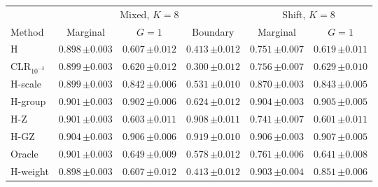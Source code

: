 \begin{tabular}{lccccc}\toprule
 & \multicolumn{3}{c}{Mixed, $K=8$} & \multicolumn{2}{c}{Shift, $K=8$} \\
Method & Marginal & $G=1$ & Boundary & Marginal & $G=1$ \\\midrule
H & $0.898\,{\scriptstyle\pm 0.003}$ & $0.607\,{\scriptstyle\pm 0.012}$ & $0.413\,{\scriptstyle\pm 0.012}$ & $0.751\,{\scriptstyle\pm 0.007}$ & $0.619\,{\scriptstyle\pm 0.011}$ \\
CLR$_{10^{-3}}$ & $0.899\,{\scriptstyle\pm 0.003}$ & $0.620\,{\scriptstyle\pm 0.012}$ & $0.300\,{\scriptstyle\pm 0.012}$ & $0.756\,{\scriptstyle\pm 0.007}$ & $0.629\,{\scriptstyle\pm 0.010}$ \\
H-scale & $0.899\,{\scriptstyle\pm 0.003}$ & $0.842\,{\scriptstyle\pm 0.006}$ & $0.531\,{\scriptstyle\pm 0.010}$ & $0.870\,{\scriptstyle\pm 0.003}$ & $0.843\,{\scriptstyle\pm 0.005}$ \\
H-group & $0.901\,{\scriptstyle\pm 0.003}$ & $0.902\,{\scriptstyle\pm 0.006}$ & $0.624\,{\scriptstyle\pm 0.012}$ & $0.904\,{\scriptstyle\pm 0.003}$ & $0.905\,{\scriptstyle\pm 0.005}$ \\
H-Z & $0.901\,{\scriptstyle\pm 0.003}$ & $0.603\,{\scriptstyle\pm 0.011}$ & $0.908\,{\scriptstyle\pm 0.011}$ & $0.741\,{\scriptstyle\pm 0.007}$ & $0.601\,{\scriptstyle\pm 0.011}$ \\
H-GZ & $0.904\,{\scriptstyle\pm 0.003}$ & $0.906\,{\scriptstyle\pm 0.006}$ & $0.919\,{\scriptstyle\pm 0.010}$ & $0.906\,{\scriptstyle\pm 0.003}$ & $0.907\,{\scriptstyle\pm 0.005}$ \\
Oracle & $0.901\,{\scriptstyle\pm 0.003}$ & $0.649\,{\scriptstyle\pm 0.009}$ & $0.578\,{\scriptstyle\pm 0.012}$ & $0.761\,{\scriptstyle\pm 0.006}$ & $0.641\,{\scriptstyle\pm 0.008}$ \\
H-weight & $0.898\,{\scriptstyle\pm 0.003}$ & $0.607\,{\scriptstyle\pm 0.012}$ & $0.413\,{\scriptstyle\pm 0.012}$ & $0.903\,{\scriptstyle\pm 0.004}$ & $0.851\,{\scriptstyle\pm 0.006}$ \\
\bottomrule
\end{tabular}
